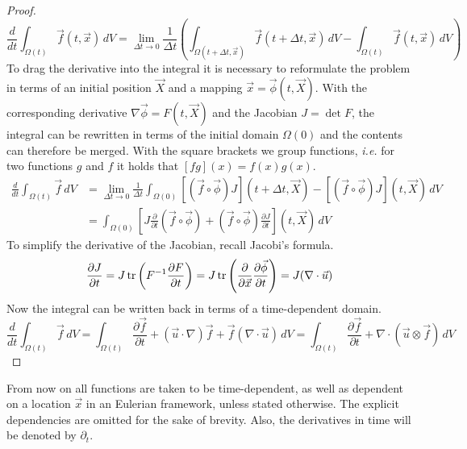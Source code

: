 \begin{proof}
	\begin{equation*}
		\frac{d}{dt}\int_{\Omega (t)}\vec {f}(t, \vec{x}) \,dV = \lim_{\Delta t\to 0} \frac{1}{\Delta t} \left(\int_{\Omega (t+\Delta t, \vec{x})}\vec{f}(t+\Delta t, \vec{x}) \,dV-\int_{\Omega (t)}\vec{f}(t, \vec{x}) \,dV\right)
	\end{equation*}
	To drag the derivative into the integral it is necessary to reformulate the problem in terms of an initial position $\vec{X}$ and a mapping $\vec{x}=\vec{\phi}(t, \vec{X})$. With the corresponding derivative $\nabla\vec{\phi} = F(t, \vec{X})$ and the Jacobian $J = \det F$, the integral can be rewritten in terms of the initial domain $\Omega(0)$ and the contents can therefore be merged. With the square brackets we group functions, \textit{i.e.} for two functions $g$ and $f$ it holds that $[fg](x) = f(x)g(x)$.
	\begin{align*}
		\frac{d}{dt}\int_{\Omega(t)}\vec{f}\,dV & = \lim_{\Delta t\to 0} \frac{1}{\Delta t} \int_{\Omega (0)}\left[(\vec{f}\circ\vec{\phi})J\right](t+\Delta t, \vec{X}) - \left[(\vec{f}\circ\vec{\phi})J\right](t, \vec{X})\,dV \\
		                                        & = \int_{\Omega (0)} \left[J\frac{\partial}{\partial t}(\vec{f}\circ\vec{\phi}) + (\vec{f}\circ\vec{\phi})\frac{\partial J}{\partial t}\right](t, \vec{X})\,dV
	\end{align*}
	To simplify the derivative of the Jacobian, recall Jacobi's formula.
	\begin{equation*}
		\frac{\partial J}{\partial t} = J\operatorname{tr}\left(F^{-1}\frac{\partial F}{\partial t}\right)= J\operatorname{tr}\left(\frac{\partial}{\partial\vec{x}}\frac{\partial \vec{\phi}}{\partial t}\right) = J(\nabla\cdot\vec{u})
	\end{equation*}
	Now the integral can be written back in terms of a time-dependent domain.
	\begin{equation*}
		\frac{d}{dt}\int_{\Omega (t)}\vec {f} \,dV = \int_{\Omega (t)}\frac{\partial\vec{f}}{\partial t} + (\vec{u}\cdot\nabla)\vec{f} + \vec{f}(\nabla\cdot\vec{u})\,dV = \int_{\Omega (t)}\frac{\partial\vec{f}}{\partial t} + \nabla\cdot(\vec{u}\otimes\vec{f})\,dV
	\end{equation*}
\end{proof}

From now on all functions are taken to be time-dependent, as well as dependent on a location $\vec{x}$ in an Eulerian framework, unless stated otherwise. The explicit dependencies are omitted for the sake of brevity. Also, the derivatives in time will be denoted by $\partial_{t}$.

